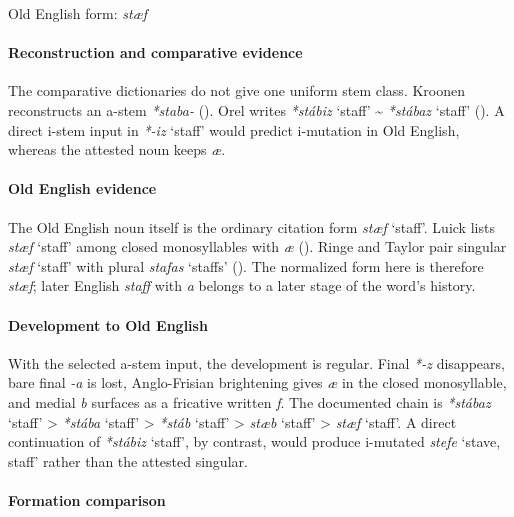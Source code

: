 \documentclass[
  british,
  a4paper,
]{article}
\providecommand{\Recon}[1]{\emph{*#1}}
\begin{document}
Old English form: \emph{stæf}

\paragraph{Reconstruction and comparative
evidence}\label{reconstruction-and-comparative-evidence-113}

The comparative dictionaries do not give one uniform stem class. Kroonen
reconstructs an a-stem \emph{*staba-}
(). Orel writes
\Recon{stábiz} `staff' \textasciitilde{} \Recon{stábaz} `staff'
(). A direct i-stem input in
\Recon{-iz} `staff' would predict i-mutation in Old English, whereas the
attested noun keeps \emph{æ}.

\paragraph{Old English evidence}\label{old-english-evidence-115}

The Old English noun itself is the ordinary citation form {\emph{stæf}}
`staff'. Luick lists {\emph{stæf}} `staff' among closed monosyllables
with \emph{æ} (). Ringe
and Taylor pair singular {\emph{stæf}} `staff' with plural
{\emph{stafas}} `staffs' (). The normalized form here is therefore \emph{stæf};
later English \emph{staff} with \emph{a} belongs to a later stage of the
word's history.

\paragraph{Development to Old
English}\label{development-to-old-english-113}

With the selected a-stem input, the development is regular. Final
\emph{*-z} disappears, bare final \emph{-a} is lost, Anglo-Frisian
brightening gives \emph{æ} in the closed monosyllable, and medial
\emph{b} surfaces as a fricative written \emph{f}. The documented chain
is \Recon{stábaz} `staff' \textgreater{} \Recon{stába} `staff'
\textgreater{} \Recon{stáb} `staff' \textgreater{} \emph{stæb} `staff'
\textgreater{} \emph{stæf} `staff'. A direct continuation of
\Recon{stábiz} `staff', by contrast, would produce i-mutated
{\emph{stefe}} `stave, staff' rather than the attested singular.

\paragraph{Formation comparison}\label{formation-comparison-4}
\end{document}
